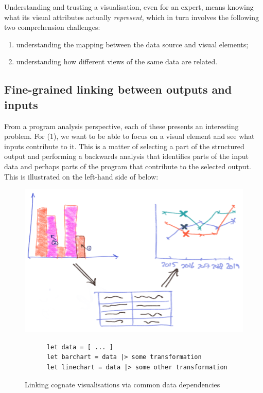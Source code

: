 Understanding and trusting a visualisation, even for an expert, means knowing what its visual attributes actually \emph{represent}, which in turn involves the following two comprehension challenges:

\begin{enumerate}
  \item understanding the mapping between the data source and visual elements;
  \item understanding how different views of the same data are related.
\end{enumerate}

\subsection{Fine-grained linking between outputs and inputs}

\noindent From a program analysis perspective, each of these presents an interesting problem. For (1), we want to be able to focus on a visual element and see what inputs contribute to it. This is a matter of selecting a part of the structured output and performing a backwards analysis that identifies parts of the input data and perhaps parts of the program that contribute to the selected output. This is illustrated on the left-hand side of  below:

\begin{figure}[H]
   {\includegraphics[scale=0.14]{fig/example/vis-linking.png}}
   \small
   \begin{lstlisting}
      let data = [ ... ]
      let barchart = data |> some transformation
      let linechart = data |> some other transformation
   \end{lstlisting}
   \caption{Linking cognate visualisations via common data dependencies}
   \label{fig:introduction:vis-linking}
\end{figure}


